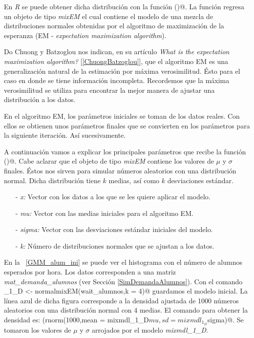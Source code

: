 En \textit{R} se puede obtener dicha distribución con la función \verb@normalmixEM()@. La función regresa un objeto de tipo \textit{mixEM} el cual contiene el modelo de una mezcla de distribuciones normales obtenidas por el algoritmo de maximización de la esperanza (EM - \textit{expectation maximization algorithm}).

Do Chuong y Batzoglou nos indican, en su artículo \textit{What is the expectation maximization algorithm?} [\ref{ChuongBatzoglou}], que el algoritmo EM es una generalización natural de la estimación por máxima verosimilitud. Ésto para el caso en donde se tiene información incompleta. Recordemos que la máxima verosimilitud se utiliza para encontrar la mejor manera de ajustar una distribución a los datos.

En el algoritmo EM, los parámetros iniciales se toman de los datos reales. Con ellos se obtienen unos parámetros finales que se convierten en los parámetros para la siguiente iteración. Así sucesivamente.

A continuación vamos a explicar los principales parámetros que recibe la función \verb@normalmixEM()@. Cabe aclarar que el objeto de tipo \textit{mixEM} contiene los valores de $\mu$ y $\sigma$ finales. Éstos nos sirven para simular números aleatorios con una distribución normal. Dicha distribución tiene $k$ medias, así como $k$ desviaciones estándar.

\begin{itemize}
\item[-] \textit{x: } Vector con los datos a los que se les quiere aplicar el modelo.

\item[-] \textit{mu: } Vector con las medias iniciales para el algoritmo EM.

\item[-] \textit{sigma: } Vector con las desviaciones estándar iniciales del modelo.

\item[-] \textit{k: } Número de distribuciones normales que se ajustan a los datos.
\end{itemize}

En la \figurename{~\ref{GMM_alum_ini}} se puede ver el histograma con el número de alumnos esperados por hora. Los datos corresponden a una matriz \textit{mat\_demanda\_alumnos} (ver Sección \ref{SimDemandaAlumnos}). Con el comando \verb@mixmdl_1_D <- normalmixEM(wait_alumnos,k = 4)@ guardamos el modelo inicial. La línea azul de dicha figura corresponde a la densidad ajustada de 1000 números aleatorios con una distribución normal con 4 medias. El comando para obtener la densidad es: \verb@density(rnorm(1000,mean = mixmdl_1_D$mu,sd = mixmdl_1_D$sigma)@. Se tomaron los valores de $\mu$ y $\sigma$ arrojados por el modelo \textit{mixmdl\_1\_D}.

